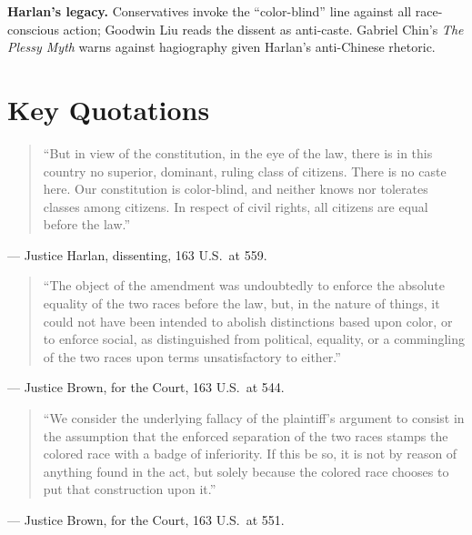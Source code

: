 \documentclass[12pt]{article}
\begin{document}
\textbf{Harlan's legacy.} Conservatives invoke the ``color-blind'' line against all race-conscious action; Goodwin Liu reads the dissent as anti-caste. Gabriel Chin's \textit{The Plessy Myth} warns against hagiography given Harlan's anti-Chinese rhetoric.

\section{Key Quotations}

\begin{quote}
``But in view of the constitution, in the eye of the law, there is in this country no superior, dominant, ruling class of citizens. There is no caste here. Our constitution is color-blind, and neither knows nor tolerates classes among citizens. In respect of civil rights, all citizens are equal before the law.''
\end{quote}
\noindent --- Justice Harlan, dissenting, 163 U.S.\ at 559.

\begin{quote}
``The object of the amendment was undoubtedly to enforce the absolute equality of the two races before the law, but, in the nature of things, it could not have been intended to abolish distinctions based upon color, or to enforce social, as distinguished from political, equality, or a commingling of the two races upon terms unsatisfactory to either.''
\end{quote}
\noindent --- Justice Brown, for the Court, 163 U.S.\ at 544.

\begin{quote}
``We consider the underlying fallacy of the plaintiff's argument to consist in the assumption that the enforced separation of the two races stamps the colored race with a badge of inferiority. If this be so, it is not by reason of anything found in the act, but solely because the colored race chooses to put that construction upon it.''
\end{quote}
\noindent --- Justice Brown, for the Court, 163 U.S.\ at 551.
\end{document}
